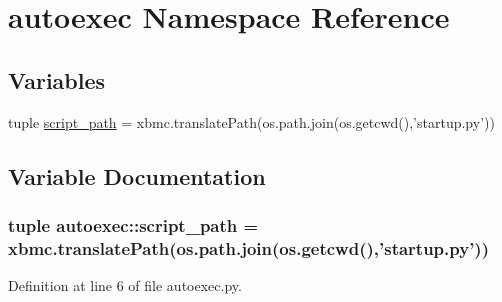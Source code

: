 \hypertarget{namespaceautoexec}{
\section{autoexec Namespace Reference}
\label{namespaceautoexec}
}
\subsection*{Variables}
\begin{DoxyCompactItemize}
\item 
tuple \hyperlink{namespaceautoexec_a4da784ea2e0d1335deb9d19521105d0b}{script\_\-path} = xbmc.translatePath(os.path.join(os.getcwd(),'startup.py'))
\end{DoxyCompactItemize}


\subsection{Variable Documentation}
\hypertarget{namespaceautoexec_a4da784ea2e0d1335deb9d19521105d0b}{
\subsubsection[{script\_\-path}]{\setlength{\rightskip}{0pt plus 5cm}tuple {\bf autoexec::script\_\-path} = xbmc.translatePath(os.path.join(os.getcwd(),'startup.py'))}}
\label{namespaceautoexec_a4da784ea2e0d1335deb9d19521105d0b}


Definition at line 6 of file autoexec.py.

